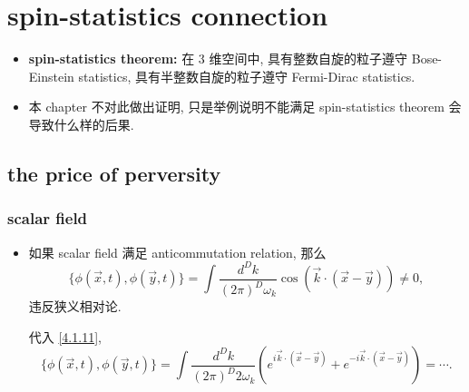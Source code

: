 \chapter{spin-statistics connection}
\begin{itemize}
	\item \textbf{spin-statistics theorem:} 在 3 维空间中, 具有整数自旋的粒子遵守 Bose-Einstein statistics, 具有半整数自旋的粒子遵守 Fermi-Dirac statistics.
	
	\item 本 chapter 不对此做出证明, 只是举例说明不能满足 spin-statistics theorem 会导致什么样的后果.
\end{itemize}

\section{the price of perversity}
\subsection{scalar field}
\begin{itemize}
	\item 如果 scalar field 满足 anticommutation relation, 那么
	\begin{equation}
		\{\phi(\vec{x}, t), \phi(\vec{y}, t)\} = \int \frac{d^D k}{(2 \pi)^D \omega_k} \cos(\vec{k} \cdot (\vec{x} - \vec{y})) \neq 0,
	\end{equation}
	违反狭义相对论.
	
	\begin{tcolorbox}[title=calculation:]
		代入 \eqref{4.1.11},
		\begin{equation}
			\{\phi(\vec{x}, t), \phi(\vec{y}, t)\} = \int \frac{d^D k}{(2 \pi)^D 2 \omega_k} (e^{i \vec{k} \cdot (\vec{x} - \vec{y})} + e^{- i \vec{k} \cdot (\vec{x} - \vec{y})}) = \cdots.
		\end{equation}
	\end{tcolorbox}
\end{itemize}


